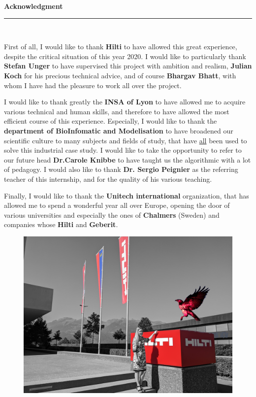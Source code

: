 \documentclass[12pt, french, a4paper]{article} %
\begin{document}
\newpage
\thispagestyle{empty} 
    \begin{center}
		{ \huge \bfseries Acknowledgment}\\
		\rule{\linewidth}{0.2 mm} \\[1.5 cm]
    \end{center}

First of all, I would like to thank \textbf{Hilti} to have allowed this great experience, despite the critical situation of this year 2020. I would like to particularly thank \textbf{Stefan Unger} to have supervised this project with ambition and realism, \textbf{Julian Koch} for his precious technical advice, and of course \textbf{Bhargav Bhatt}, with whom I have had the pleasure to work all over the project.\\
\par I would like to thank greatly the \textbf{INSA of Lyon} to have allowed me to acquire various technical and human skills, and therefore to have allowed the most efficient course of this experience. Especially, I would like to thank the \textbf{department of BioInfomatic and Modelisation} to have broadened our scientific culture to many subjects and fields of study, that have \underline{all} been used to solve this industrial case study. I would like to take the opportunity to refer to our future head \textbf{Dr.Carole Knibbe} to have taught us the algorithmic with a lot of pedagogy. I would also like to thank \textbf{Dr. Sergio Peignier} as the referring teacher of this internship, and for the quality of his various teaching.\\
\par Finally, I would like to thank the \textbf{Unitech international} organization, that has allowed me to spend a wonderful year all over Europe, opening the door of various universities and especially the ones of \textbf{Chalmers} (Sweden) and companies whose \textbf{Hilti} and \textbf{Geberit}.
\begin{center}
    \begin{figure}[H]
 \centering
 \includegraphics[scale=0.07]{figure/IMgarde.jpg}~\\[1cm]
\end{figure}
 		
\end{center}
\end{document}
